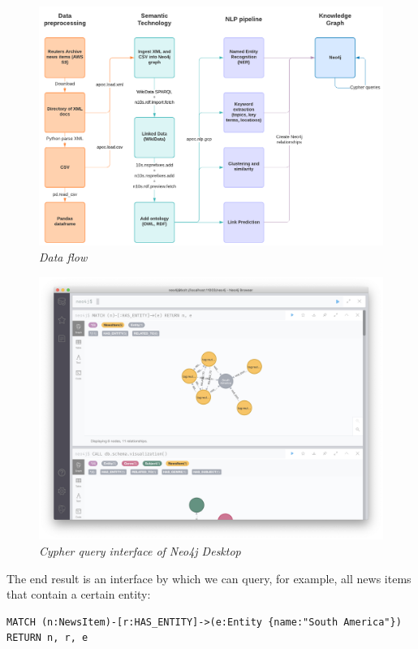 \documentclass[11pt]{article}
\begin{document}
\begin{figure}
\centerline{\includegraphics[scale=0.225]{data-pipeline}}
\caption{\textit{Data flow}}
\end{figure}

\begin{figure}
\centerline{\includegraphics[scale=0.225]{neo4j-cypher-interface}}
\caption{\textit{Cypher query interface of Neo4j Desktop}}
\end{figure}

The end result is an interface by which we can query, for example, all news items that contain a certain entity:

\begin{verbatim}
MATCH (n:NewsItem)-[r:HAS_ENTITY]->(e:Entity {name:"South America"})
RETURN n, r, e
\end{verbatim}
\end{document}
